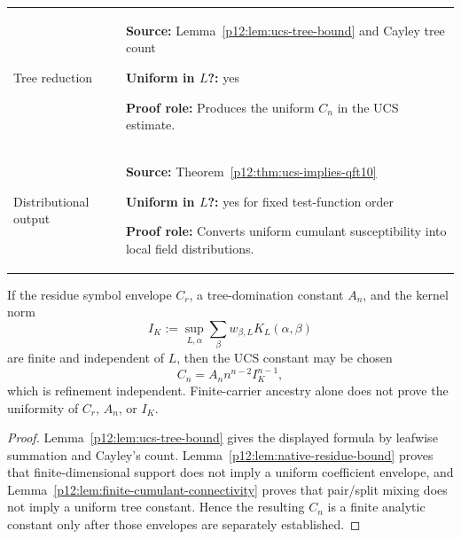 \documentclass[12pt,a4paper]{article}
\begin{document}
\begin{longtable}{@{}>{\raggedright\arraybackslash}p{} >{\raggedright\arraybackslash}p{}@{}}
Tree reduction & \textbf{Source:} Lemma~\ref{p12:lem:ucs-tree-bound} and Cayley tree count\par\textbf{Uniform in $L$?:} yes\par\textbf{Proof role:} Produces the uniform \(C_n\) in the UCS estimate.  \\
Distributional output & \textbf{Source:} Theorem~\ref{p12:thm:ucs-implies-qft10}\par\textbf{Uniform in $L$?:} yes for fixed test-function order\par\textbf{Proof role:} Converts uniform cumulant susceptibility into local field distributions.  \\
\bottomrule
\end{longtable}

\begin{corollary}
\label{p12:cor:ucs-constants-finite-carrier}
If the residue symbol envelope \(C_r\), a tree-domination constant \(A_n\), and the kernel norm
\[
I_K:=\sup_{L,\alpha}\sum_\beta w_{\beta,L}K_L(\alpha,\beta)
\]
are finite and independent of \(L\), then the UCS constant may be chosen
\[
C_n=A_n n^{n-2}I_K^{n-1},
\]
which is refinement independent.  Finite-carrier ancestry alone does not prove the uniformity of \(C_r\), \(A_n\), or \(I_K\).
\end{corollary}
\begin{proof}
Lemma~\ref{p12:lem:ucs-tree-bound} gives the displayed formula by leafwise summation and Cayley's count.  Lemma~\ref{p12:lem:native-residue-bound} proves that finite-dimensional support does not imply a uniform coefficient envelope, and Lemma~\ref{p12:lem:finite-cumulant-connectivity} proves that pair/split mixing does not imply a uniform tree constant.  Hence the resulting \(C_n\) is a finite analytic constant only after those envelopes are separately established.
\end{proof}
\end{document}
